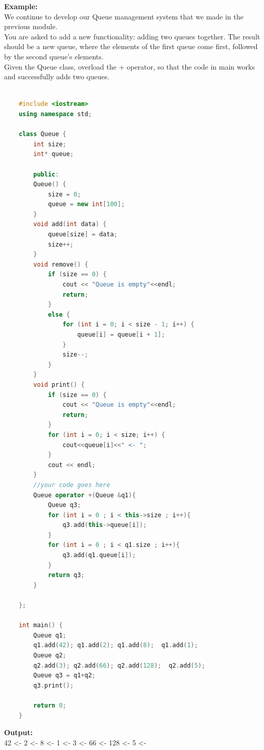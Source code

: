 \documentclass[12pt , a4paper]{article}
\begin{document}
	\begin{tcolorbox}
	\textbf{Example:}\\
	We continue to develop our Queue management system that we made in the previous module.\\
	You are asked to add a new functionality: adding two queues together. The result should be a new queue, where the elements of the first queue come first, followed by the second queue's elements.\\
	Given the Queue class, overload the + operator, so that the code in main works and successfully adds two queues.
	\end{tcolorbox}
	\begin{lstlisting}[language=C++]
	
	#include <iostream>
	using namespace std;
	
	class Queue {
		int size;
		int* queue;
	
		public:
		Queue() {
			size = 0;
			queue = new int[100];
		}
		void add(int data) {
			queue[size] = data;
			size++;
		}
		void remove() {
			if (size == 0) {
				cout << "Queue is empty"<<endl;
				return;
			}
			else {
				for (int i = 0; i < size - 1; i++) {
					queue[i] = queue[i + 1];
				}
				size--;
			}
		}
		void print() {
			if (size == 0) {
				cout << "Queue is empty"<<endl;
				return;
			}
			for (int i = 0; i < size; i++) {
				cout<<queue[i]<<" <- ";
			}
			cout << endl;
		}
		//your code goes here
		Queue operator +(Queue &q1){
			Queue q3;
			for (int i = 0 ; i < this->size ; i++){
				q3.add(this->queue[i]);
			}
			for (int i = 0 ; i < q1.size ; i++){
				q3.add(q1.queue[i]);
			}
	        return q3;
		}
	
	};
	
	int main() {
		Queue q1;
		q1.add(42); q1.add(2); q1.add(8);  q1.add(1);
		Queue q2;
		q2.add(3); q2.add(66); q2.add(128);  q2.add(5);
		Queue q3 = q1+q2;
		q3.print();
	
		return 0;
	}

	\end{lstlisting}

	\begin{tcolorbox}
	\textbf{Output:}\\
	42 <- 2 <- 8 <- 1 <- 3 <- 66 <- 128 <- 5 <-
	\end{tcolorbox}
\end{document}
